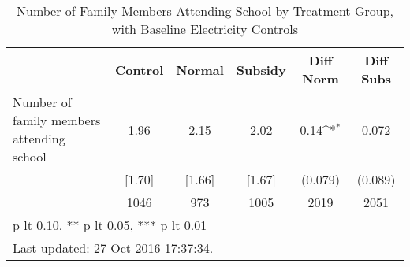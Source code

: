 \begin{table}[htbp]\centering
\def\sym#1{\ifmmode^{#1}\else\(^{#1}\)\fi}
\caption{Number of Family Members Attending School by Treatment Group, with Baseline Electricity Controls \label{tab:"balance"}}
\begin{tabular*}{0.9\hsize}{@{\hskip\tabcolsep\extracolsep\fill}l*{1}{ccccc}}
\toprule
                                &  Control&   Normal&  Subsidy&Diff Norm         &Diff Subs         \\
\midrule
Number of family members attending school&     1.96&     2.15&     2.02&     0.14\sym{*}  &    0.072         \\
                                &   [1.70]&   [1.66]&   [1.67]&  (0.079)         &  (0.089)         \\
                                &     1046&      973&     1005&     2019         &     2051         \\
\bottomrule
\multicolumn{6}{l}{\footnotesize * p lt 0.10, ** p lt 0.05, *** p lt 0.01}\\
\multicolumn{6}{l}{\footnotesize Last updated: 27 Oct 2016 17:37:34.}\\
\end{tabular*}
\end{table}
